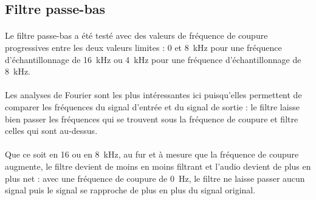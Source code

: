 \documentclass{article}
\begin{document}
    \subsection{Filtre passe-bas}
    \paragraph{}
    Le filtre passe-bas a été testé avec des valeurs de fréquence de coupure progressives entre les deux valeurs limites : 0 et \SI{8}{\kilo\hertz} pour une fréquence d'échantillonnage de \SI{16}{\kilo\hertz} ou \SI{4}{\kilo\hertz} pour une fréquence d'échantillonnage de \SI{8}{\kilo\hertz}.

    \paragraph{}
    Les analyses de Fourier sont les plus intéressantes ici puisqu'elles permettent de comparer les fréquences du signal d'entrée et du signal de sortie : le filtre laisse bien passer les fréquences qui se trouvent sous la fréquence de coupure et filtre celles qui sont au-dessus.

    \paragraph{}
    Que ce soit en 16 ou en \SI{8}{\kilo\hertz}, au fur et à mesure que la fréquence de coupure augmente, le filtre devient de moins en moins filtrant et l'audio devient de plus en plus net : avec une fréquence de coupure de \SI{0}{\hertz}, le filtre ne laisse passer aucun signal puis le signal se rapproche de plus en plus du signal original.
\end{document}
